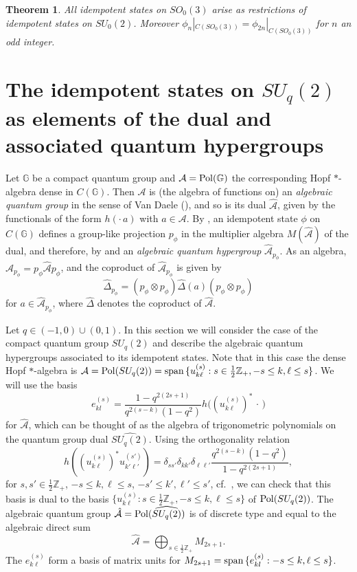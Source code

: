 \documentclass[12pt]{amsart}
\newtheorem{theorem}{Theorem}[section]
\theoremstyle{definition}
\theoremstyle{remark}
\numberwithin{equation}{section}
\begin{document}
\begin{theorem}\label{theo-so03}
All idempotent states on $SO_0(3)$ arise as restrictions of idempotent states
on $SU_0(2)$. Moreover $\phi_n|_{C(SO_0(3))} =
\phi_{2n}|_{C(SO_0(3))}$ for $n$ an odd integer.
\end{theorem}

\section{The idempotent states on $SU_q(2)$ as elements of the dual and associated quantum hypergroups}
\label{hypergr} Let ${\mathbb{G}}$ be a compact quantum group and $\mathcal{A}={{\rm
  Pol}(\mathbb{G})}$ the corresponding Hopf $*$-algebra 
dense in $C({\mathbb{G}})$. Then $\mathcal{A}$ is (the algebra of functions on) an \emph{algebraic quantum group} in the 
sense of Van Daele (\cite{Van Daele 98}), and so is its dual $\hat{\mathcal{A}}$, given by the functionals of the 
form $h(\cdot\,a)$ with $a\in\mathcal{A}$. By \cite[Lemma 3.1]{franz+skalski08a}, an idempotent state $\phi$ on 
$C({\mathbb{G}})$ defines a group-like projection $p_\phi$ in the multiplier algebra $M(\hat{\mathcal{A}})$ of the dual, 
and therefore, by \cite[Theorem 2.7]{landstad+vandaele07} and \cite[Theorem 2.4]{franz+skalski08a} an 
\emph{algebraic quantum hypergroup} $\hat{\mathcal{A}}_{p_\phi}$. As an algebra, $\hat{\mathcal{A}}_{p_\phi}= 
p_\phi\hat{\mathcal{A}}p_\phi$, and the coproduct of $\hat{\mathcal{A}}_{p_\phi}$ is given by
\[
\hat{\Delta}_{p_\phi} = (p_\phi\otimes p_\phi)\hat{\Delta}(a)(p_\phi\otimes p_\phi)
\]
for $a\in \hat{\mathcal{A}}_{p_\phi}$, where $\hat{\Delta}$ denotes the coproduct of
$\hat{\mathcal{A}}$.

Let $q\in (-1,0)\cup(0,1)$. In
this section we will consider the case of the compact quantum group $SU_q(2)$
and describe the algebraic quantum hypergroups associated to its idempotent
states. Note that in this case the dense Hopf $*$-algebra is
$\mathcal{A}={\rm Pol}(SU_q(2))={\rm span}\,\{u^{(s)}_{k\ell}: s\in\frac{1}{2}\mathbb{Z}_+,-s\le
    k,\ell\le s\}$. We will use the basis
\[
e^{(s)}_{kl} = \frac{1-q^{2(2s+1)}}{q^{2(s-k)}(1-q^2)}h\big((u^{(s)}_{k\ell})^*\,\cdot\,\big)
\]
for $\hat{\mathcal{A}}$, which can be thought of as the algebra of trigonometric polynomials on the quantum group dual $\widehat{SU_q(2)}$. Using the orthogonality
relation
\[
h\left((u^{(s)}_{k\ell})^* u^{(s')}_{k'\ell'}\right) = \delta_{ss'} \delta_{kk'}\delta_{\ell\ell'}\frac{q^{2(s-k)}(1-q^2)}{1-q^{2(2s+1)}},
\]
for $s,s'\in\frac{1}{2}\mathbb{Z}_+$, $-s\le k,\ell\le s$, $-s'\le k',\ell'\le
s'$, cf.\ \cite[Eq.\ (5.12)]{koornwinder89},
we can check that this basis is dual to the basis $\{u^{(s)}_{k\ell}:
s\in\frac{1}{2}\mathbb{Z}_+,-s\le k,\ell\le s\}$ of ${\rm Pol}(SU_q(2))$. The
algebraic quantum group
$\hat{\mathcal{A}}={\rm Pol}(\widehat{SU_q(2)})$ is of discrete type and equal to the algebraic direct sum
\[
\hat{\mathcal{A}} =\bigoplus_{s\in \frac{1}{2}\mathbb{Z}_+} M_{2s+1}.
\]
The $e^{(s)}_{k\ell}$ form a basis of matrix units for $M_{2s+1}={\rm
  span}\,\{e^{(s)}_{kl}: -s\le k,\ell\le s\}$.
\end{document}
